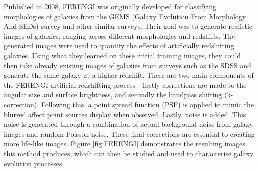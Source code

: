 \documentclass[fleqn,usenatbib]{mnras}
\begin{document}
Published in 2008, FERENGI \citet{Barden2008} was originally developed for classifying morphologies of galaxies from the GEMS (Galaxy Evolution From Morphology And SEDs) \citep{Rix2004} survey and other similar surveys.  Their goal was to generate realistic images of galaxies, ranging across different morphologies and redshifts. The generated images were used to quantify the effects of artificially redshifting galaxies. Using what they learned on these initial training images, they could then take already existing images of galaxies from surveys such as the SDSS and generate the same galaxy at a higher redshift. There are two main components of the FERENGI artificial redshifting process - firstly corrections are made to the angular size and surface brightness, and secondly the bandpass shifting (k-correction). Following this, a point spread function (PSF) is applied to mimic the blurred affect point sources display when observed. Lastly, noise is added. This noise is generated through a combination of actual background noise from galaxy images and random Poisson noise. These final corrections are essential to creating more life-like images. Figure \ref{fig:FERENGI} demonstrates the resulting images this method produces, which can then be studied and used to characterise galaxy evolution processes.
\end{document}
